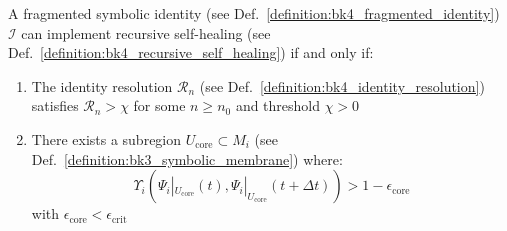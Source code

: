 \begin{theorem} \label{theorem:bk4_conditions_for_self_healing}
A fragmented symbolic identity (see Def.~\ref{definition:bk4_fragmented_identity}) $\mathcal{I}$ can implement recursive self-healing (see Def.~\ref{definition:bk4_recursive_self_healing}) if and only if:
\begin{enumerate}
    \item The identity resolution $\mathcal{R}_n$ (see Def.~\ref{definition:bk4_identity_resolution}) satisfies $\mathcal{R}_n > \chi$ for some $n \geq n_0$ and threshold $\chi > 0$
    \item There exists a subregion $U_{\text{core}} \subset M_i$ (see Def.~\ref{definition:bk3_symbolic_membrane}) where:
    \begin{equation}
        \Upsilon_i(\Psi_i|_{U_{\text{core}}}(t), \Psi_i|_{U_{\text{core}}}(t+\Delta t)) > 1 - \epsilon_{\text{core}}
    \end{equation}
    with $\epsilon_{\text{core}} < \epsilon_{\text{crit}}$
\end{enumerate}
\end{theorem}
